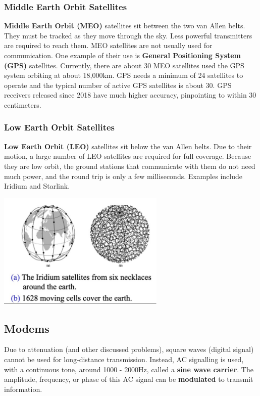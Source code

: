 \documentclass[11pt]{article}
\begin{document}
\subsubsection{Middle Earth Orbit Satellites}
\textbf{Middle Earth Orbit (MEO)} satellites sit between the two van Allen belts. 
They must be tracked as they move through the sky. 
Less powerful transmitters are required to reach them. 
MEO satellites are not usually used for communication. 
One example of their use is \textbf{General Positioning System (GPS)} satellites. 
Currently, there are about 30 MEO satellites used the GPS system orbiting at about 18,000km.
GPS needs a minimum of 24 satellites to operate and the typical number of active GPS satellites is about 30. 
GPS receivers released since 2018 have much higher accuracy, pinpointing to within 30 centimeters. 

\subsubsection{Low Earth Orbit Satellites}
\textbf{Low Earth Orbit (LEO)} satellites sit below the van Allen belts.
Due to their motion, a large number of LEO satellites are required for full coverage. 
Because they are low orbit, the ground stations that communicate with them do not need much power, and the round trip is only 
a few milliseconds. 
Examples include Iridium and Starlink. 

\begin{center}
    \includegraphics[width=0.6\textwidth]{iridium.png}
\end{center}

\subsection{Modems}
Due to attenuation (and other discussed problems), square waves (digital signal) cannot be used for long-distance transmission. 
Instead, AC signalling is used, with a continuous tone, around 1000 - 2000Hz, called a \textbf{sine wave carrier}. 
The amplitude, frequency, or phase of this AC signal can be \textbf{modulated} to transmit information.
\end{document}
